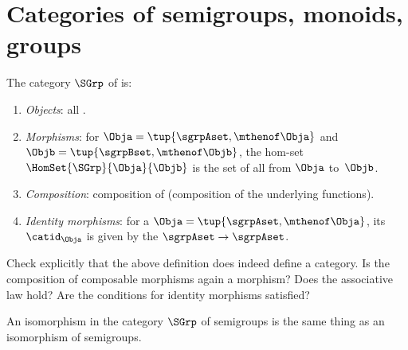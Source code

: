 
\section[Categories of semigroups, monoids, groups]{Categories of semigroups, monoids, groups}
\label{sec:cats-of-semigroups-monoids-groups}


\begin{ctdefinition}
    \label{def:SGrp}
    The category $\SGrp$ of  is:
    \begin{enumerate}
        \item \emph{Objects}: all .
        \item \emph{Morphisms}: for  $\Obja = \tup{\sgrpAset,{ \mthenof \Obja}}$ and $\Objb = \tup{\sgrpBset,{ \mthenof \Objb}}$, the hom-\-set $\HomSet{\SGrp}{\Obja}{\Objb}$ is the set of all  from $\Obja$ to~$\Objb$.
        \item \emph{Composition}: composition of  (composition of the underlying functions).
        \item \emph{Identity morphisms}: for a  $\Obja = \tup{\sgrpAset, {\mthenof \Obja}}$, its  $\catid_\Obja$ is given by the  $\sgrpAset \to \sgrpAset$.
    \end{enumerate}
\end{ctdefinition}

\begin{gradedexercise}
    Check explicitly that the above definition does indeed define a category.
    Is the composition of composable morphisms again a morphism? Does the associative law hold? Are the conditions for identity morphisms satisfied?
\end{gradedexercise}


\begin{remark}
    An isomorphism in the category $\SGrp$ of semigroups is the same thing as an isomorphism of semigroups.
\end{remark}


